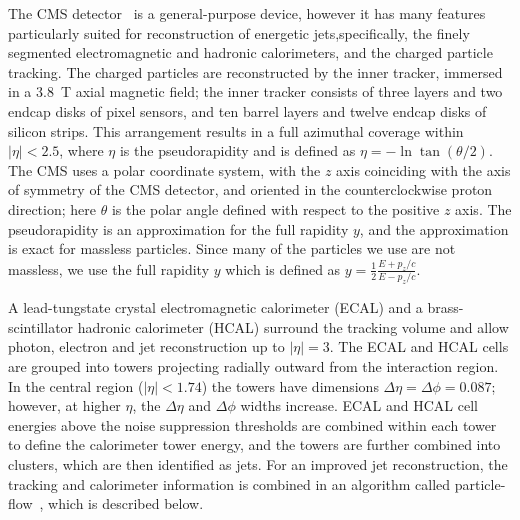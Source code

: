 \label{sec:cms_detector}


The CMS detector~\cite{:2008zzk}
is a general-purpose device, however it has
many features particularly suited for reconstruction of 
energetic jets,specifically, the finely segmented electromagnetic
and hadronic calorimeters, and the charged particle tracking.
The charged particles are reconstructed by the inner tracker,
immersed in a $3.8$~T axial magnetic field; the inner tracker consists
of three layers and two endcap disks of pixel sensors, and ten
barrel layers and twelve endcap disks of silicon strips.  This
arrangement results
in a full azimuthal coverage within $|\eta| < 2.5$, where $\eta$
is the pseudorapidity and is defined as $\eta = -\ln\tan(\theta/2)$.
The CMS uses a polar coordinate system, with the 
$z$ axis coinciding with the axis of symmetry of the CMS detector,
and oriented in the counterclockwise proton direction; here $\theta$ 
is the polar angle defined with respect to the positive $z$ axis.
The pseudorapidity is an approximation for the full rapidity $y$, and
the approximation is exact for massless particles. Since many of the
particles we use are not massless, we use the full rapidity $y$ which
is defined as $y = \frac{1}{2} \frac {E + p_{z}/c}{E - p_{z}/c}$.

A lead-tungstate crystal electromagnetic calorimeter (ECAL) and 
a brass-scintillator hadronic calorimeter (HCAL) surround the tracking
volume and allow photon, electron and jet reconstruction up to $|\eta|=3$.
The ECAL and HCAL cells are grouped into towers projecting radially 
outward from the interaction region.  In the central region ($|\eta|<1.74$)
the towers have dimensions $\Delta\eta = \Delta\phi = 0.087$; however,
at higher $\eta$, the $\Delta\eta$ and $\Delta\phi$ widths increase.  
ECAL and HCAL
cell energies above the noise suppression thresholds are combined within
each tower to define the calorimeter tower energy, and the towers are further
combined into clusters, which are then identified as jets.  For an improved
jet reconstruction, the tracking and calorimeter information is combined 
in an algorithm called particle-flow~\cite{particleflow}, which is described
below.

